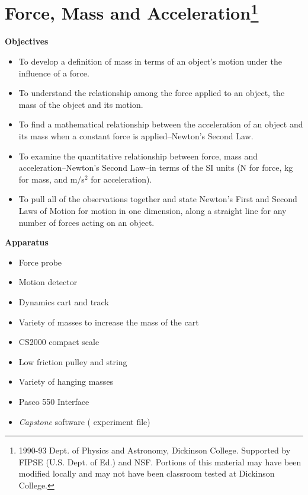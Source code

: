 
\section{Force, Mass and Acceleration\footnote{
1990-93 Dept. of Physics and Astronomy, Dickinson College. Supported by FIPSE
(U.S. Dept. of Ed.) and NSF. Portions of this material may have been modified
locally and may not have been classroom tested at Dickinson College.
}}
\makelabheader %

\bigskip
\textbf{Objectives }

\begin{itemize}
\item To develop a definition of mass in terms of an object's motion under the influence
of a force. 
\item To understand the relationship among the force applied to an object, the mass
of the object and its motion. 
\item To find a mathematical relationship between the acceleration of an object and
its mass when a constant force is applied--Newton's Second Law. 
\item To examine the quantitative relationship between force, mass and acceleration--Newton's
Second Law--in terms of the SI units (N for force, kg for mass, and m/s$^2$ for
acceleration). 
\item To pull all of the observations together and state Newton's First and Second
Laws of Motion for motion in one dimension, along a straight line for any number
of forces acting on an object.
\end{itemize}

\bigskip
\textbf{Apparatus }

\begin{itemize}
\item Force probe 
\item Motion detector 
\item Dynamics cart and track 
\item Variety of masses to increase the mass of the cart 
\item CS2000 compact scale
\item Low friction pulley and string 
\item Variety of hanging masses 
\item Pasco 550 Interface
\item \textit{Capstone} software ( experiment file)
\end{itemize}

